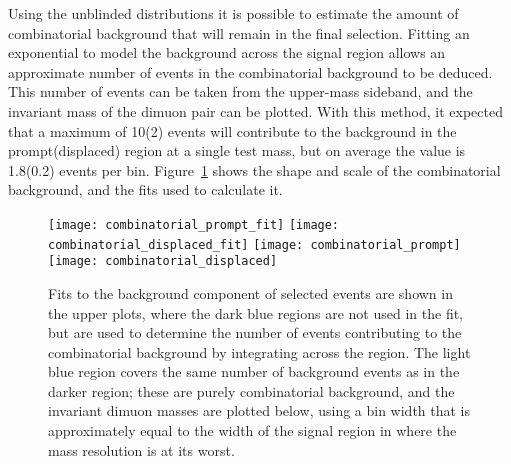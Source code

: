 Using the unblinded distributions it is possible to estimate the amount of combinatorial background
that will remain in the final selection.
Fitting an exponential to model the background across the signal region allows an approximate
number of events in the combinatorial background to be deduced.
This number of events can be taken from the upper-mass sideband, and the invariant mass of the
dimuon pair can be plotted.
With this method, it expected that a maximum of 10(2) events will contribute to the background in
the prompt(displaced) region at a single test mass, but on average the value is 1.8(0.2) events per
bin.
Figure~\ref{fig:db:comb} shows the shape and scale of the combinatorial background, and the fits
used to calculate it.

\begin{figure}
  \begin{center}
    \texttt{[image: combinatorial\_prompt\_fit]}
    \texttt{[image: combinatorial\_displaced\_fit]}
    \texttt{[image: combinatorial\_prompt]}
    \texttt{[image: combinatorial\_displaced]}
    \caption[Estimation of combinatorial background contribution]
    {
      Fits to the background component of selected \btokstrmumu events are shown in the upper
      plots, where the dark blue regions are not used in the fit, but are used to determine the
      number of events contributing to the combinatorial background by integrating across the
      region.
      The light blue region covers the same number of background events as in the darker region;
      these are purely combinatorial background, and the invariant dimuon masses are plotted below,
      using a bin width that is approximately equal to the width of the signal region in where the
      mass resolution is at its worst.
    }
    \label{fig:db:comb}
  \end{center}
\end{figure}




